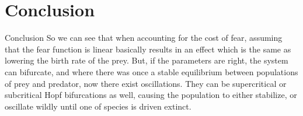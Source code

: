 \documentclass{beamer}
\begin{document}
\section{Conclusion}
\begin{frame}{Conclusion}
So we can see that when accounting for the cost of fear, assuming that the fear function is linear basically results in an effect which is the same as lowering the birth rate of the prey. But, if the parameters are right, the system can bifurcate, and where there was once a stable equilibrium between populations of prey and predator, now there exist oscillations. They can be supercritical or subcritical Hopf bifurcations as well, causing the population to either stabilize, or oscillate wildly until one of species is driven extinct. 
\end{frame}
\end{document}
